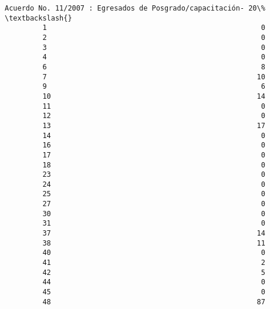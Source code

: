 \documentclass[11pt]{article}
\begin{document}
\begin{Verbatim}[commandchars=\\\{\}]
             Acuerdo No. 11/2007 : Egresados de Posgrado/capacitación- 20\%  \textbackslash{}
         1                                                   0               
         2                                                   0               
         3                                                   0               
         4                                                   0               
         6                                                   8               
         7                                                  10               
         9                                                   6               
         10                                                 14               
         11                                                  0               
         12                                                  0               
         13                                                 17               
         14                                                  0               
         16                                                  0               
         17                                                  0               
         18                                                  0               
         23                                                  0               
         24                                                  0               
         25                                                  0               
         27                                                  0               
         30                                                  0               
         31                                                  0               
         37                                                 14               
         38                                                 11               
         40                                                  0               
         41                                                  2               
         42                                                  5               
         44                                                  0               
         45                                                  0               
         48                                                 87               
         

\end{Verbatim}
\end{document}
